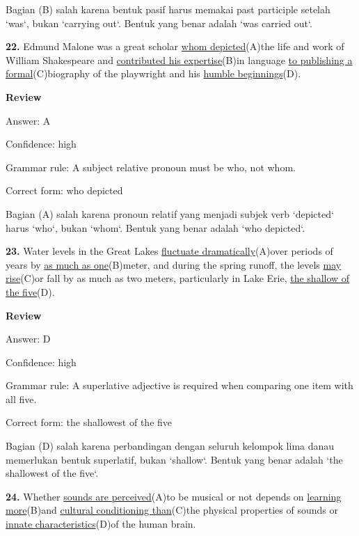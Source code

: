 \documentclass[12pt]{article}
\begin{document}
Bagian (B) salah karena bentuk pasif harus memakai past participle setelah `was`, bukan `carrying out`. Bentuk yang benar adalah `was carried out`.\par
\endgroup
\par
\vspace{\questionblockgap}
\noindent\textbf{22.} Edmund Malone was a great scholar \uline{whom depicted}(A)the life and work of William Shakespeare and \uline{contributed his expertise}(B)in language \uline{to publishing a formal}(C)biography of the playwright and his \uline{humble beginnings}(D).
\par
\begingroup
\setlength{\parskip}{0pt}
\setlength{\parindent}{0pt}
\textbf{Review}\par
Answer: A\par
Confidence: high\par
Grammar rule: A subject relative pronoun must be who, not whom.\par
Correct form: who depicted\par
Bagian (A) salah karena pronoun relatif yang menjadi subjek verb `depicted` harus `who`, bukan `whom`. Bentuk yang benar adalah `who depicted`.\par
\endgroup
\par
\vspace{\questionblockgap}
\noindent\textbf{23.} Water levels in the Great Lakes \uline{fluctuate dramatically}(A)over periods of years by \uline{as much as one}(B)meter, and during the spring runoff, the levels \uline{may rise}(C)or fall by as much as two meters, particularly in Lake Erie, \uline{the shallow of the five}(D).
\par
\begingroup
\setlength{\parskip}{0pt}
\setlength{\parindent}{0pt}
\textbf{Review}\par
Answer: D\par
Confidence: high\par
Grammar rule: A superlative adjective is required when comparing one item with all five.\par
Correct form: the shallowest of the five\par
Bagian (D) salah karena perbandingan dengan seluruh kelompok lima danau memerlukan bentuk superlatif, bukan `shallow`. Bentuk yang benar adalah `the shallowest of the five`.\par
\endgroup
\par
\vspace{\questionblockgap}
\noindent\textbf{24.} Whether \uline{sounds are perceived}(A)to be musical or not depends on \uline{learning more}(B)and \uline{cultural conditioning than}(C)the physical properties of sounds or \uline{innate characteristics}(D)of the human brain.
\end{document}
